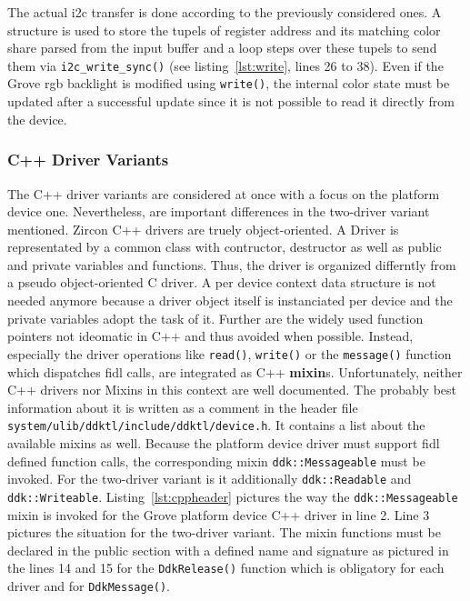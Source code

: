 The actual \ac{i2c} transfer is done according to the previously considered ones.
A structure is used to store the tupels of register address and its matching color share parsed from the input buffer and a loop steps over these tupels to send them via \texttt{i2c_write_sync()} (see listing~\ref{lst:write}, lines 26 to 38).
Even if the Grove \ac{rgb} backlight is modified using \texttt{write()}, the internal color state must be updated after a successful update since it is not possible to read it directly from the device.



\subsubsection*{C++ Driver Variants}
The C++ driver variants are considered at once with a focus on the platform device one.
Nevertheless, are important differences in the two-driver variant mentioned.
Zircon C++ drivers are truely object-oriented.
A Driver is representated by a common class with contructor, destructor as well as public and private variables and functions.
Thus, the driver is organized differntly from a pseudo object-oriented C driver.
A per device context data structure is not needed anymore because a driver object itself is instanciated per device and the private variables adopt the task of it.  
Further are the widely used function pointers not ideomatic in C++ and thus avoided when possible.
Instead, especially the driver operations like \texttt{read()}, \texttt{write()} or the \texttt{message()} function which dispatches \ac{fidl} calls, are integrated as C++ \textbf{mixin}s.
Unfortunately, neither C++ drivers nor Mixins in this context are well documented.
The probably best information about it is written as a comment in the header file \texttt{system/ulib/ddktl/include/ddktl/device.h}.
It contains a list about the available mixins as well.
Because the platform device driver must support \ac{fidl} defined function calls, the corresponding mixin \texttt{ddk::Messageable} must be invoked.
For the two-driver variant is it additionally \texttt{ddk::Readable} and \texttt{ddk::Writeable}.
Listing~\ref{lst:cppheader} pictures the way the \texttt{ddk::Messageable} mixin is invoked for the Grove platform device C++ driver in line 2.
Line 3 pictures the situation for the two-driver variant.
The mixin functions must be declared in the public section with a defined name and signature as pictured in the lines 14 and 15 for the \texttt{DdkRelease()} function which is obligatory for each driver and for \texttt{DdkMessage()}.


